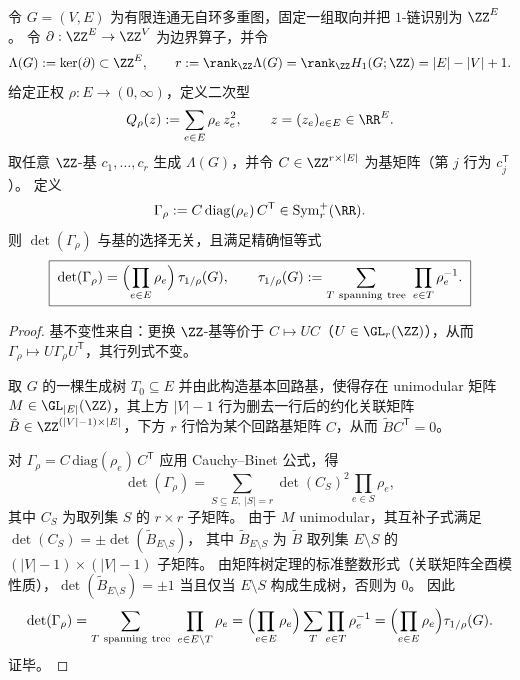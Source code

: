 \begin{theorem}[加权回路格判别式的矩阵树恒等式]\label{thm:graph-cycle-lattice-weighted-discriminant}
令 \(G=(V,E)\) 为有限连通无自环多重图，固定一组取向并把 \(1\)-链识别为 \(\ZZ^{E}\)。
令 \(\partial:\ZZ^{E}\to \ZZ^{V}\) 为边界算子，并令
\[
\Lambda(G):=\ker(\partial)\subset \ZZ^{E},
\qquad
r:=\rank_{\ZZ}\Lambda(G)=\rank_{\ZZ}H_1(G;\ZZ)=|E|-|V|+1.
\]
给定正权 \(\rho:E\to(0,\infty)\)，定义二次型
\[
Q_\rho(z):=\sum_{e\in E}\rho_e\,z_e^2,\qquad z=(z_e)_{e\in E}\in\RR^{E}.
\]
取任意 \(\ZZ\)-基 \(c_1,\dots,c_r\) 生成 \(\Lambda(G)\)，并令 \(C\in\ZZ^{r\times |E|}\) 为基矩阵（第 \(j\) 行为 \(c_j^{\mathsf T}\)）。
定义
\[
\Gamma_\rho:=C\,\mathrm{diag}(\rho_e)\,C^{\mathsf T}\in \mathrm{Sym}_r^+(\RR).
\]
则 \(\det(\Gamma_\rho)\) 与基的选择无关，且满足精确恒等式
\[
\boxed{\;
\det(\Gamma_\rho)=\Bigl(\prod_{e\in E}\rho_e\Bigr)\,\tau_{1/\rho}(G),
\qquad
\tau_{1/\rho}(G):=\sum_{T\ \mathrm{spanning\ tree}}\ \prod_{e\in T}\rho_e^{-1}.
\;}
\]
\end{theorem}
\begin{proof}
基不变性来自：更换 \(\ZZ\)-基等价于 \(C\mapsto UC\)（\(U\in\GL_r(\ZZ)\)），从而 \(\Gamma_\rho\mapsto U\Gamma_\rho U^{\mathsf T}\)，其行列式不变。
\par
取 \(G\) 的一棵生成树 \(T_0\subseteq E\) 并由此构造基本回路基，使得存在 unimodular 矩阵 \(M\in\GL_{|E|}(\ZZ)\)，其上方 \(|V|-1\) 行为删去一行后的约化关联矩阵 \(\tilde B\in\ZZ^{(|V|-1)\times |E|}\)，下方 \(r\) 行恰为某个回路基矩阵 \(C\)，从而 \(\tilde B C^{\mathsf T}=0\)。
\par
对 \(\Gamma_\rho=C\,\mathrm{diag}(\rho_e)\,C^{\mathsf T}\) 应用 Cauchy--Binet 公式，得
\[
\det(\Gamma_\rho)
=\sum_{S\subseteq E,\ |S|=r}\det(C_S)^2\prod_{e\in S}\rho_e,
\]
其中 \(C_S\) 为取列集 \(S\) 的 \(r\times r\) 子矩阵。
由于 \(M\) unimodular，其互补子式满足
\(
\det(C_S)=\pm\det(\tilde B_{E\setminus S})
\)，
其中 \(\tilde B_{E\setminus S}\) 为 \(\tilde B\) 取列集 \(E\setminus S\) 的 \((|V|-1)\times(|V|-1)\) 子矩阵。
由矩阵树定理的标准整数形式（关联矩阵全酉模性质），\(\det(\tilde B_{E\setminus S})=\pm 1\) 当且仅当 \(E\setminus S\) 构成生成树，否则为 \(0\)。
因此
\[
\det(\Gamma_\rho)
=\sum_{T\ \mathrm{spanning\ tree}}\ \prod_{e\in E\setminus T}\rho_e
=\Bigl(\prod_{e\in E}\rho_e\Bigr)\sum_{T}\prod_{e\in T}\rho_e^{-1}
=\Bigl(\prod_{e\in E}\rho_e\Bigr)\tau_{1/\rho}(G).
\]
证毕。
\end{proof}




